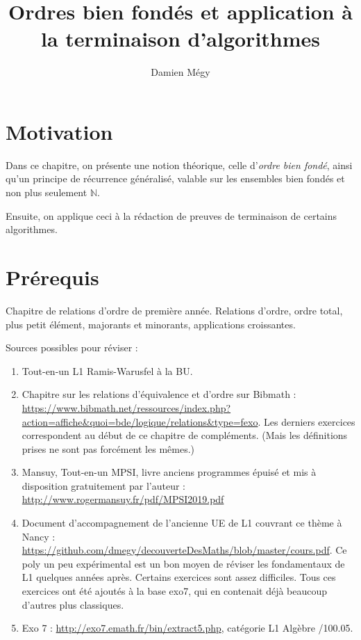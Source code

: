 \documentclass[12pt]{article}
\title{Ordres bien fondés et application à la terminaison d'algorithmes}
\author{Damien Mégy}
\newcommand{\N}{\mathbb{N}}
\begin{document}
\maketitle

\tableofcontents

\section{Motivation}

Dans ce chapitre, on présente une notion théorique, celle d'\emph{ordre bien fondé}, ainsi qu'un principe de récurrence généralisé, valable sur les ensembles bien fondés et non plus seulement $\N$.

Ensuite, on applique ceci à la rédaction de preuves de terminaison de certains algorithmes.

\section{Prérequis}

Chapitre de relations d'ordre de première année. Relations d'ordre, ordre total, plus petit élément, majorants et minorants, applications croissantes.

Sources possibles pour réviser : 
\begin{enumerate}
\item Tout-en-un L1 Ramis-Warusfel à la BU.
\item Chapitre sur les relations d'équivalence et d'ordre sur Bibmath : \url{https://www.bibmath.net/ressources/index.php?action=affiche&quoi=bde/logique/relations&type=fexo}. Les derniers exercices correspondent au début de ce chapitre de compléments. (Mais les définitions prises ne sont pas forcément les mêmes.)
\item Mansuy, Tout-en-un MPSI, livre \og anciens programmes\fg{} épuisé et  mis à disposition gratuitement par l'auteur : \url{http://www.rogermansuy.fr/pdf/MPSI2019.pdf}
\item Document d'accompagnement de l'ancienne UE de L1 couvrant ce thème à Nancy : \url{https://github.com/dmegy/decouverteDesMaths/blob/master/cours.pdf}. Ce poly un peu expérimental est un bon moyen de réviser les fondamentaux de L1 quelques années après. Certains exercices sont assez difficiles. Tous ces exercices ont été ajoutés à la base exo7, qui en contenait déjà beaucoup d'autres plus classiques.
\item Exo 7 : \url{http://exo7.emath.fr/bin/extract5.php}, catégorie L1 Algèbre /100.05. 
\end{enumerate}
\end{document}

